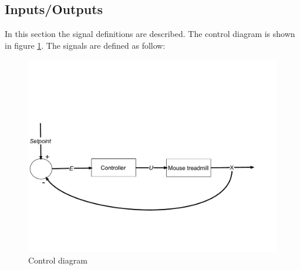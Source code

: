\documentclass[12pt,a4paper]{article}
\begin{document}
\subsection{Inputs/Outputs}
In this section the signal definitions are described.
The control diagram is shown in figure \ref{fig:ctrl_diag}. The signals are defined as follow:
\begin{figure}[H]
	\centering
	\includegraphics[width=0.8\linewidth]{fig/ctrl_diag.pdf}
	\caption{Control diagram}\label{fig:ctrl_diag}
\end{figure}
\end{document}
